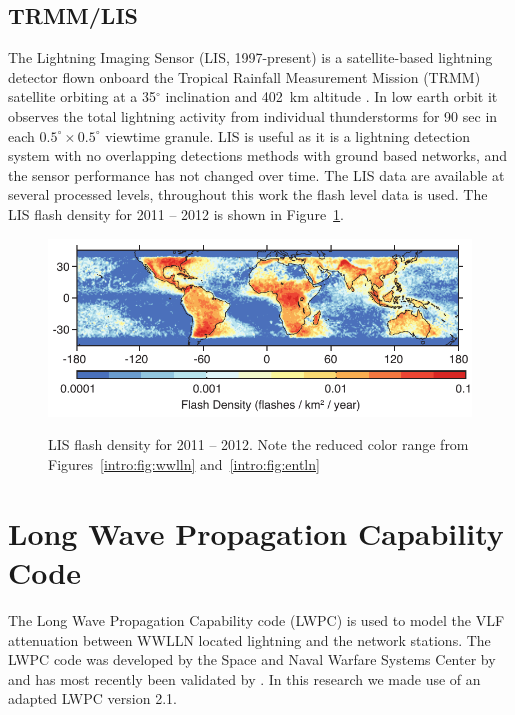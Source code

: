 \subsection{TRMM/LIS}

The Lightning Imaging Sensor (LIS, 1997-present) is a satellite-based lightning detector flown onboard the Tropical Rainfall Measurement Mission (TRMM) satellite orbiting at a 35$^\circ$ inclination and 402~km altitude \citep{Christian1999}.
In low earth orbit it observes the total lightning activity from individual thunderstorms for 90 sec in each $0.5^\circ \times 0.5^\circ$ viewtime granule.
LIS is useful as it is a lightning detection system with no overlapping detections methods with ground based networks, and the sensor performance has not changed over time.
The LIS data are available at several processed levels, throughout this work the flash level data is used.
The LIS flash density for 2011 -- 2012 is shown in Figure~\ref{intro:fig:lis}.

\begin{figure}[ht!]
	\centering
	\includegraphics[scale=1]{Introduction/Figures/lis_density.pdf}\\
	\caption{LIS flash density for 2011 -- 2012.
		     Note the reduced color range from Figures~\ref{intro:fig:wwlln} and~\ref{intro:fig:entln}}
	\label{intro:fig:lis}
\end{figure}

\section{Long Wave Propagation Capability Code}

The Long Wave Propagation Capability code (LWPC) is used to model the VLF attenuation between WWLLN located lightning and the network stations.
The LWPC code was developed by the Space and Naval Warfare Systems Center by \citet{Ferguson1998} and has most recently been validated by \citet{McRae2000d, Thomson2011}.
In this research we made use of an adapted LWPC version 2.1.

